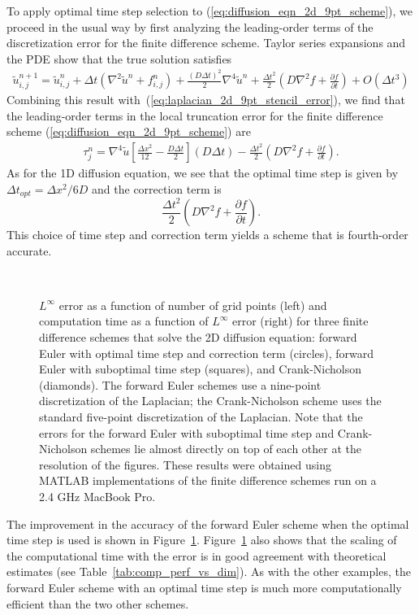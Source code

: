 \documentclass[fleqn,12pt,twoside]{article}
\newcommand{\beq}{\begin{equation}}
\newcommand{\eeq}{\end{equation}}
\newcommand{\bea}{\begin{eqnarray}}
\newcommand{\eea}{\end{eqnarray}}
\def\pt{\partial t}
\def\tu{\tilde{u}}
\def\dt{\Delta t}
\def\dx{\Delta x}
\def\dto{\dt_{opt}}
\begin{document}
To apply optimal time step selection to (\ref{eq:diffusion_eqn_2d_9pt_scheme}), we proceed in the usual way by first analyzing the leading-order terms of the 
discretization error for the finite difference scheme.  Taylor series 
expansions and the PDE show that the true solution satisfies 
\bea
  \tu^{n+1}_{i,j} = \tu^{n}_{i,j}
  + \dt \left(\nabla^2 \tu^{n} +f^n_{i,j} \right)
  + \frac{(D \dt)^2}{2} \nabla^4 \tu^{n}
  + \frac{\dt^2}{2} \left( D\nabla^2 f + \frac{\partial f}{\pt} \right)
  + O \left( \dt^3 \right)
  \label{eq:diffusion_eqn_2d_time_err} 
\eea
Combining this result with~(\ref{eq:laplacian_2d_9pt_stencil_error}), 
we find that the leading-order terms in the 
local truncation error for the finite difference 
scheme (\ref{eq:diffusion_eqn_2d_9pt_scheme}) are
\bea
  \tau^{n}_j = 
  \nabla^4 \tu
      \left[ \frac{\dx^2}{12} - \frac{D \dt}{2}  \right] (D \dt)
  - \frac{\dt^2}{2} \left( D\nabla^2 f + \frac{\partial f}{\pt} \right).
  \label{eq:diffusion_eqn_2d_trunc_err}
\eea
As for the 1D diffusion equation, we see that the optimal time step is given 
by $\dto = \dx^2/6D$ and the correction term is 
\beq
  \frac{\dt^2}{2} \left( D\nabla^2 f + \frac{\partial f}{\pt} \right).
\eeq
This choice of time step and correction term yields a scheme that is 
fourth-order accurate.  

\begin{figure}[tb]
\begin{center}
\ \ 
\caption{$L^\infty$ error as a function of number of grid points (left)
and computation time as a function of $L^\infty$ error (right) for three
finite difference schemes that solve the 2D diffusion equation:
forward Euler with optimal time step and correction term (circles), forward 
Euler with suboptimal time step (squares), and Crank-Nicholson (diamonds).  
The forward Euler schemes use a nine-point discretization of the Laplacian;
the Crank-Nicholson scheme uses the standard five-point discretization of
the Laplacian.  
Note that the errors for the forward Euler with suboptimal time step and 
Crank-Nicholson schemes lie almost directly on top of each other at the 
resolution of the figures.  
These results were obtained using MATLAB implementations of the 
finite difference schemes run on a 2.4 GHz MacBook Pro.
}
\label{fig:diffusion_eqn_2d_src_analysis}
\end{center}
\end{figure}
The improvement in the accuracy of the forward Euler scheme when the optimal 
time step is used is shown in Figure~\ref{fig:diffusion_eqn_2d_src_analysis}.
Figure~\ref{fig:diffusion_eqn_2d_src_analysis} also shows that the 
scaling of the computational time with the error is in good agreement with 
theoretical estimates (see Table~\ref{tab:comp_perf_vs_dim}).  As with the
other examples, the forward Euler scheme with an optimal time step is much 
more computationally efficient than the two other schemes.  
\end{document}
